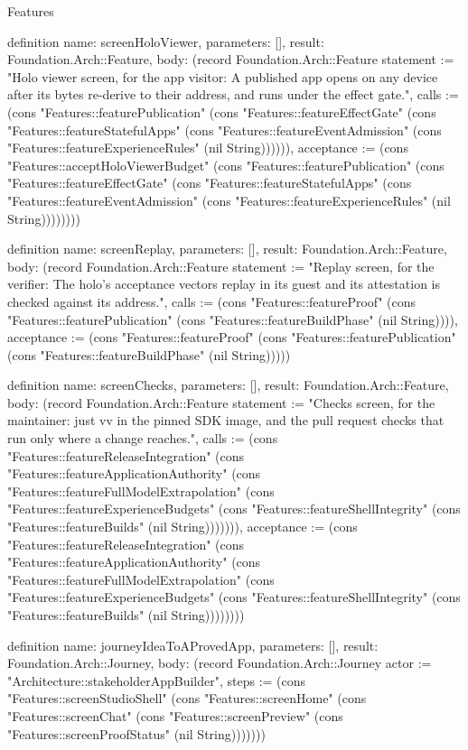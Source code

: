 \begin{lexlean}{Features}
\begin{semanticmodule}
definition{
  name: screenHoloViewer,
  parameters: [],
  result: Foundation.Arch::Feature,
  body: (record Foundation.Arch::Feature {statement := "Holo viewer screen, for the app visitor: A published app opens on any device after its bytes re-derive to their address, and runs under the effect gate.", calls := (cons "Features::featurePublication" (cons "Features::featureEffectGate" (cons "Features::featureStatefulApps" (cons "Features::featureEventAdmission" (cons "Features::featureExperienceRules" (nil String)))))), acceptance := (cons "Features::acceptHoloViewerBudget" (cons "Features::featurePublication" (cons "Features::featureEffectGate" (cons "Features::featureStatefulApps" (cons "Features::featureEventAdmission" (cons "Features::featureExperienceRules" (nil String)))))))})
}

definition{
  name: screenReplay,
  parameters: [],
  result: Foundation.Arch::Feature,
  body: (record Foundation.Arch::Feature {statement := "Replay screen, for the verifier: The holo's acceptance vectors replay in its guest and its attestation is checked against its address.", calls := (cons "Features::featureProof" (cons "Features::featurePublication" (cons "Features::featureBuildPhase" (nil String)))), acceptance := (cons "Features::featureProof" (cons "Features::featurePublication" (cons "Features::featureBuildPhase" (nil String))))})
}

definition{
  name: screenChecks,
  parameters: [],
  result: Foundation.Arch::Feature,
  body: (record Foundation.Arch::Feature {statement := "Checks screen, for the maintainer: just vv in the pinned SDK image, and the pull request checks that run only where a change reaches.", calls := (cons "Features::featureReleaseIntegration" (cons "Features::featureApplicationAuthority" (cons "Features::featureFullModelExtrapolation" (cons "Features::featureExperienceBudgets" (cons "Features::featureShellIntegrity" (cons "Features::featureBuilds" (nil String))))))), acceptance := (cons "Features::featureReleaseIntegration" (cons "Features::featureApplicationAuthority" (cons "Features::featureFullModelExtrapolation" (cons "Features::featureExperienceBudgets" (cons "Features::featureShellIntegrity" (cons "Features::featureBuilds" (nil String)))))))})
}

definition{
  name: journeyIdeaToAProvedApp,
  parameters: [],
  result: Foundation.Arch::Journey,
  body: (record Foundation.Arch::Journey {actor := "Architecture::stakeholderAppBuilder", steps := (cons "Features::screenStudioShell" (cons "Features::screenHome" (cons "Features::screenChat" (cons "Features::screenPreview" (cons "Features::screenProofStatus" (nil String))))))})
}


\end{semanticmodule}
\end{lexlean}
